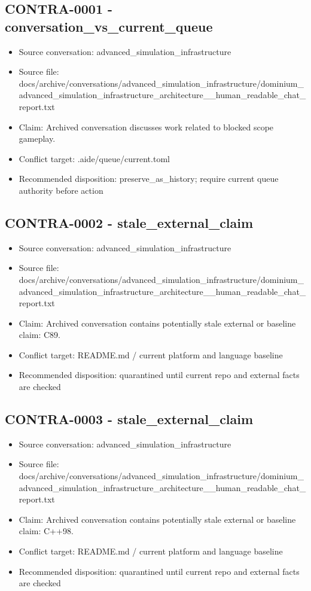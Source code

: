 \documentclass[11pt,a4paper]{report}
\begin{document}
\subsection{CONTRA-0001 - conversation\_vs\_current\_queue}

\begin{itemize}
\item Source conversation: advanced\_simulation\_infrastructure
\item Source file: docs/archive/conversations/advanced\_simulation\_infrastructure/dominium\_advanced\_simulation\_infrastructure\_architecture\_\_human\_readable\_chat\_report.txt
\item Claim: Archived conversation discusses work related to blocked scope gameplay.
\item Conflict target: .aide/queue/current.toml
\item Recommended disposition: preserve\_as\_history; require current queue authority before action
\end{itemize}

\subsection{CONTRA-0002 - stale\_external\_claim}

\begin{itemize}
\item Source conversation: advanced\_simulation\_infrastructure
\item Source file: docs/archive/conversations/advanced\_simulation\_infrastructure/dominium\_advanced\_simulation\_infrastructure\_architecture\_\_human\_readable\_chat\_report.txt
\item Claim: Archived conversation contains potentially stale external or baseline claim: C89.
\item Conflict target: README.md / current platform and language baseline
\item Recommended disposition: quarantined until current repo and external facts are checked
\end{itemize}

\subsection{CONTRA-0003 - stale\_external\_claim}

\begin{itemize}
\item Source conversation: advanced\_simulation\_infrastructure
\item Source file: docs/archive/conversations/advanced\_simulation\_infrastructure/dominium\_advanced\_simulation\_infrastructure\_architecture\_\_human\_readable\_chat\_report.txt
\item Claim: Archived conversation contains potentially stale external or baseline claim: C++98.
\item Conflict target: README.md / current platform and language baseline
\item Recommended disposition: quarantined until current repo and external facts are checked
\end{itemize}
\end{document}
